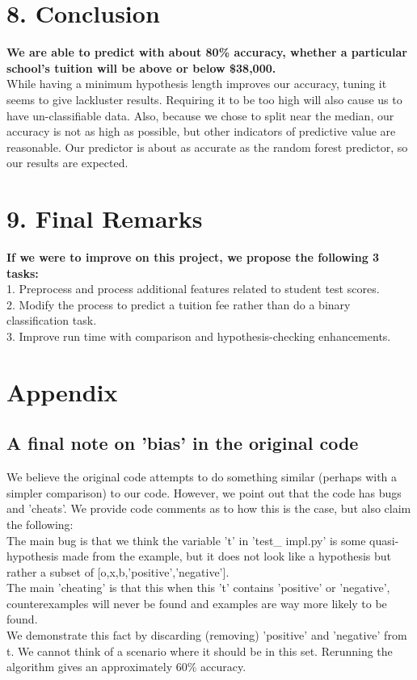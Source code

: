 \documentclass[12pt, a4, epsf] {article}
\theoremstyle{plain}
\theoremstyle{definition}
\begin{document}
\section*{8. Conclusion}
\textbf{We are able to predict with about 80\% accuracy, whether a particular school's tuition will be above or below \$38,000. }\\
While having a minimum hypothesis length improves our accuracy, tuning it seems to give lackluster results. Requiring it to be too high will also cause us to have un-classifiable data. Also, because we chose to split near the median, our accuracy is not as high as possible, but other indicators of predictive value are reasonable. Our predictor is about as accurate as the random forest predictor, so our results are expected.\\
\section*{9. Final Remarks}
\textbf{If we were to improve on this project, we propose the following 3 tasks:}\\
1. Preprocess and process additional features related to student test scores.\\
2. Modify the process to predict a tuition fee rather than do a binary classification task.\\
3. Improve run time with comparison and hypothesis-checking enhancements.

\section*{Appendix}
\subsection*{A final note on 'bias' in the original code}
We believe the original code attempts to do something similar (perhaps with a simpler comparison) to our code. However, we point out that the code has bugs and 'cheats'. We provide code comments as to how this is the case, but also claim the following:\\
The main bug is that we think the variable 't' in 'test\_ impl.py' is some quasi-hypothesis made from the example, but it does not look like a hypothesis but rather a subset of [o,x,b,'positive','negative'].\\
The main 'cheating' is that this when this 't' contains 'positive' or 'negative', counterexamples will never be found and examples are way more likely to be found.\\
We demonstrate this fact by discarding (removing) 'positive' and 'negative' from t. We cannot think of a scenario where it should be in this set. Rerunning the algorithm gives an approximately 60\% accuracy.
\end{document}
